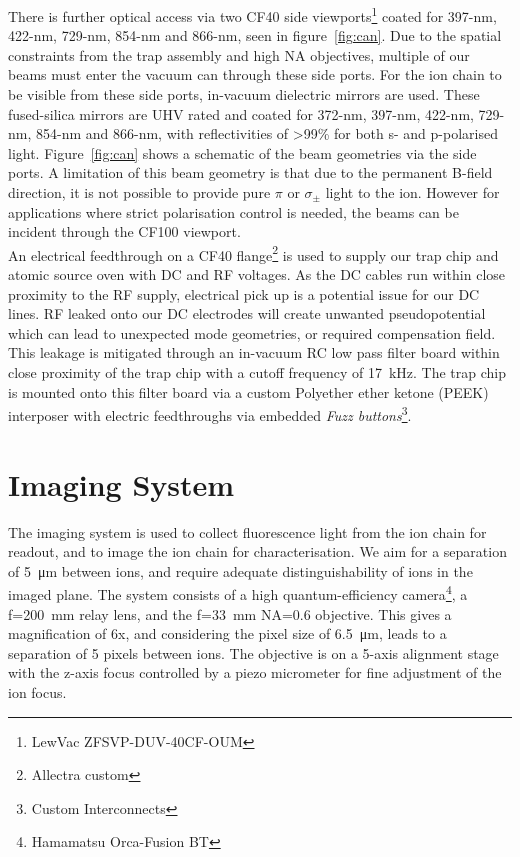     There is further optical access via
    two CF40 side viewports\footnote{LewVac ZFSVP-DUV-40CF-OUM} coated
    for 397-nm, 422-nm, 729-nm, 854-nm and 866-nm, seen in figure~\ref{fig:can}.  Due to the spatial
    constraints from the trap assembly and high NA objectives, 
    multiple of our beams must enter the vacuum can through these side ports. For the ion chain to be visible from these side ports, in-vacuum dielectric
    mirrors are used. These fused-silica mirrors are UHV rated and coated for 372-nm, 397-nm,
    422-nm, 729-nm, 854-nm and 866-nm, with reflectivities of >99\% for both s-
    and p-polarised light. Figure~\ref{fig:can} shows a schematic of the beam
    geometries via the side ports. A limitation of this beam geometry is that due to the permanent B-field direction, it is not possible to provide pure $\pi$ or $\sigma_{\pm}$ light to the ion. However for applications where strict polarisation control is needed, the beams can be incident through the CF100 viewport.\\
    An electrical feedthrough on a CF40 flange\footnote{Allectra custom} is used to supply our trap chip and atomic source oven with DC and RF voltages. As
    the DC cables run within close proximity to the RF supply, electrical pick
    up is a potential issue for our DC lines. RF leaked onto our DC electrodes
    will create unwanted pseudopotential which can lead to unexpected mode
    geometries, or required compensation field. This leakage is mitigated through
    an in-vacuum RC low pass filter board within close proximity of the trap
    chip with a cutoff frequency of 17~kHz. The trap chip is mounted onto this
    filter board via a custom Polyether ether ketone (PEEK) interposer with
    electric feedthroughs via embedded \emph{Fuzz buttons}\footnote{Custom
    Interconnects}. \\

\section{Imaging System}
\label{sec:Imaging System}

    The imaging system is used to collect fluorescence light from the ion chain
    for readout, and to image the ion chain for characterisation.
    We aim for a separation of 5~\unit{\um} between ions, and require adequate distinguishability of ions in the imaged plane.
    The system
    consists of a high quantum-efficiency camera\footnote{Hamamatsu Orca-Fusion BT}, a f=200~\unit{\mm} relay lens, and the f=33~\unit{\mm} NA=0.6 objective. This gives a magnification of 6x, and considering the pixel size of 6.5~\unit{\um}, leads to a separation of 5 pixels between ions. The objective is on a 5-axis alignment stage with the z-axis focus controlled by a piezo micrometer for fine adjustment of the ion focus.

